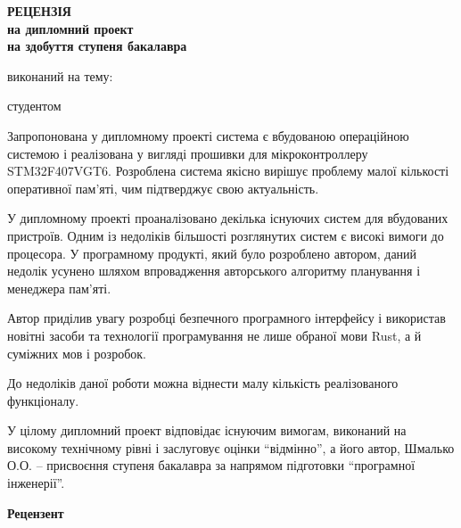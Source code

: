 \documentclass[main.tex]{subfiles}
\begin{document}
\begin{otherspecialpage}
  \begin{singlespacing}
  \begin{center}
    \textbf{
      {\large РЕЦЕНЗІЯ}\\
      на дипломний проект\\
      на здобуття ступеня бакалавра
    }\\
  \end{center}

  \noindent виконаний на тему: 

  \noindent студентом \fillinline{}\\\vspace{5mm}
  \end{singlespacing}


  Запропонована у дипломному проекті система є вбудованою операційною системою і реалізована у вигляді прошивки для мікроконтроллеру STM32F407VGT6. Розроблена система якісно вирішує проблему малої кількості оперативної пам'яті, чим підтверджує свою актуальність.

У дипломному проекті проаналізовано декілька існуючих систем для вбудованих пристроїв. Одним із недоліків більшості розглянутих систем є високі вимоги до процесора. У програмному продукті, який було розроблено автором, даний недолік усунено шляхом впровадження авторського алгоритму планування і менеджера пам'яті.

Автор приділив увагу розробці безпечного програмного інтерфейсу і використав новітні засоби та технології програмування не лише обраної мови Rust, а й суміжних мов і розробок.

До недоліків даної роботи можна віднести малу кількість реалізованого функціоналу.

У цілому дипломний проект відповідає існуючим вимогам, виконаний на високому технічному рівні і заслуговує оцінки ``відмінно'', а його автор, Шмалько О.О. -- присвоєння ступеня бакалавра за напрямом підготовки ``програмної інженерії''.

  \vfill

  \noindent
  \textbf{Рецензент}\\
  \hfill
  \fillin[(підпис)]{\hspace{22mm}}
  \hfill

  \vfill

\end{otherspecialpage}
\end{document}
